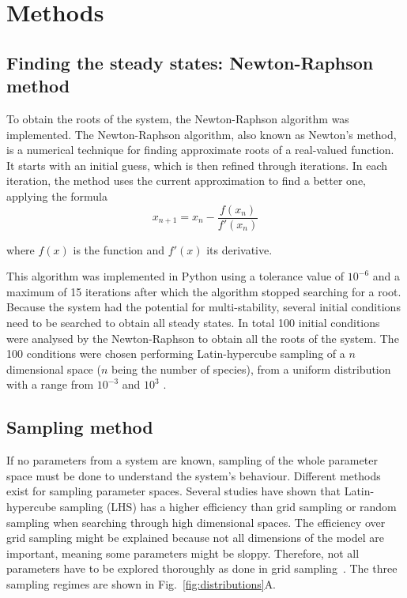 \chapter{Methods}
\section{Finding the steady states: Newton-Raphson method}\label{newton_raphson}

To obtain the roots of the system, the Newton-Raphson algorithm was implemented.
The Newton-Raphson algorithm, also known as Newton's method, is a numerical technique for finding approximate roots of a real-valued function. It starts with an initial guess, which is then refined through iterations. In each iteration, the method uses the current approximation to find a better one, applying the formula
\begin{equation}
x_{n+1} = x_{n} - \frac{f(x_{n})}{f'(x_{n})}
\end{equation}

where $f(x)$ is the function and $f'(x)$ its derivative.

This algorithm was implemented in Python using a tolerance value of $10^{-6}$ and a maximum of 15 iterations after which the algorithm stopped searching for a root.
Because the system had the potential for multi-stability, several initial conditions need to be searched to obtain all steady states.
In total 100 initial conditions were analysed by the Newton-Raphson to obtain all the roots of the system.
The 100 conditions were chosen performing Latin-hypercube sampling of a $n$ dimensional space ($n$ being the number of species), from a uniform distribution with a range from $10^{-3}$ and $10^3$ .
\section{Sampling method}\label{sampling method}
If no parameters from a system are known, sampling of the whole parameter space must be done to understand the system's behaviour.
Different methods exist for sampling parameter spaces.
Several studies have shown that Latin-hypercube sampling (LHS) has a higher efficiency than grid sampling or random sampling when searching through high dimensional spaces.
The efficiency over grid sampling might be explained because not all dimensions of the model are important, meaning some parameters might be sloppy.
Therefore, not all parameters have to be explored thoroughly as done in grid sampling~\parencite{Iman2014, Bergstra2012}.
The three sampling regimes are shown in Fig.~\ref{fig:distributions}A.


